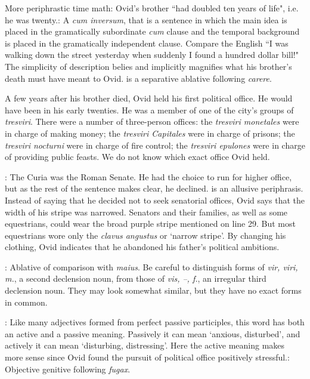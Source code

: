 
More periphrastic time math: Ovid's brother ``had doubled ten years of life",
i.e. he was twenty.\indent{}: A \textit{cum inversum}, that is
a sentence in which the main idea is placed in the gramatically subordinate
\textit{cum} clause and the temporal background is placed in the gramatically
independent clause.  Compare the English ``I was walking down the street
yesterday when suddenly I found a hundred dollar bill!"  The simplicity of
description belies and implicitly magnifies what his brother's death must have
meant to Ovid.\indent{} is a separative ablative following
\textit{carere}.


A few years after his brother died, Ovid held his first political office.  He
would have been in his early twenties.  He was a member of one of the city's
groups of \textit{tresviri}.  There were a number of three-person offices: the
\textit{tresviri monetales} were in charge of making money; the
\textit{tresviri Capitales} were in charge of prisons; the \textit{tresviri
nocturni} were in charge of fire control; the \textit{tresviri epulones} were
in charge of providing public feasts.  We do not know which exact office Ovid
held.


: The Curia was the Roman Senate.  He had the choice to run
for higher office, but as the rest of the sentence makes clear, he
declined.\indent{} is an allusive periphrasis.
Instead of saying that he decided not to seek senatorial offices, Ovid says
that the width of his stripe was narrowed.  Senators and their families, as
well as some equestrians, could wear the broad purple stripe mentioned on line
29.  But most equestrians wore only the \textit{clavus angustus} or `narrow
stripe'.  By changing his clothing, Ovid indicates that he abandoned his
father's political ambitions.


: Ablative of comparison with \textit{maius}.  Be careful
to distinguish forms of \textit{vir, viri, m.}, a second declension noun, from
those of \textit{vis, --, f.}, an irregular third declension noun.  They may
look somewhat similar, but they have no exact forms in common.


: Like many adjectives formed from perfect passive participles,
this word has both an active and a passive meaning.  Passively it can mean
`anxious, disturbed', and actively it can mean `disturbing, distressing'.  Here
the active meaning makes more sense since Ovid found the pursuit of political
office positively stressful.\indent{}: Objective genitive
following \textit{fugax}.

